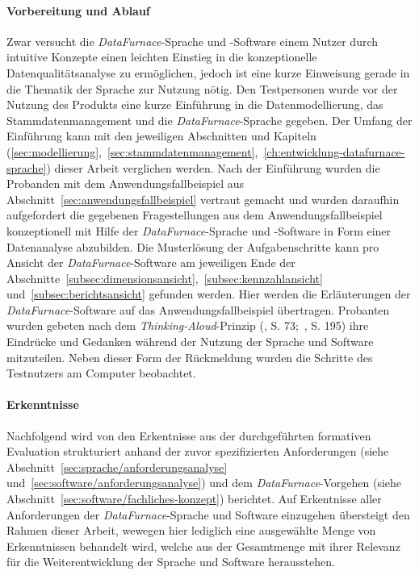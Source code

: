 \documentclass[
  language=german, %
  type=bachelor,%
  ngerman
]{isthesis}
\begin{document}
\begin{content}
\paragraph{Vorbereitung und Ablauf} Zwar versucht die
\textit{DataFurnace}-Sprache und -Software einem Nutzer durch intuitive
Konzepte einen leichten Einstieg in die konzeptionelle Datenqualitätsanalyse zu
ermöglichen, jedoch ist eine kurze Einweisung gerade in die Thematik der
Sprache zur Nutzung nötig. Den Testpersonen wurde vor der Nutzung des Produkts
eine kurze Einführung in die Datenmodellierung, das Stammdatenmanagement und
die \textit{DataFurnace}-Sprache gegeben. Der Umfang der Einführung kann mit
den jeweiligen Abschnitten und Kapiteln
(\ref{sec:modellierung},~\ref{sec:stammdatenmanagement},~\ref{ch:entwicklung-datafurnace-sprache})
dieser Arbeit verglichen werden.  Nach der Einführung wurden die Probanden mit
dem Anwendungsfallbeispiel aus Abschnitt~\ref{sec:anwendungsfallbeispiel}
vertraut gemacht und wurden daraufhin aufgefordert die gegebenen
Fragestellungen aus dem Anwendungsfallbeispiel konzeptionell mit Hilfe der
\textit{DataFurnace}-Sprache und -Software in Form einer Datenanalyse
abzubilden. Die Musterlösung der Aufgabenschritte kann pro Ansicht der
\textit{DataFurnace}-Software am jeweiligen Ende der
Abschnitte~\ref{subsec:dimensionsansicht},~\ref{subsec:kennzahlansicht}
und~\ref{subsec:berichtsansicht} gefunden werden. Hier werden die Erläuterungen
der \textit{DataFurnace}-Software auf das Anwendungsfallbeispiel übertragen.
Probanten wurden gebeten nach dem \textit{Thinking-Aloud}-Prinzip
(\cite{holzinger2005usability}, S.  73;~\cite{nielsen1994usability}, S. 195)
ihre Eindrücke und Gedanken während der Nutzung der Sprache und Software
mitzuteilen. Neben dieser Form der Rückmeldung wurden die Schritte des
Testnutzers am Computer beobachtet.

\paragraph{Erkenntnisse} Nachfolgend wird von den Erkentnisse aus der
durchgeführten formativen Evaluation strukturiert anhand der zuvor
spezifizierten Anforderungen (siehe Abschnitt~\ref{sec:sprache/anforderungsanalyse}
und~\ref{sec:software/anforderungsanalyse}) und dem
\textit{DataFurnace}-Vorgehen (siehe
Abschnitt~\ref{sec:software/fachliches-konzept}) berichtet. Auf Erkentnisse
aller Anforderungen der \textit{DataFurnace}-Sprache und Software einzugehen
übersteigt den Rahmen dieser Arbeit, wewegen hier lediglich eine ausgewählte
Menge von Erkenntnissen behandelt wird, welche aus der Gesamtmenge mit ihrer
Relevanz für die Weiterentwicklung der Sprache und Software herausstehen.


\end{content}
\end{document}
